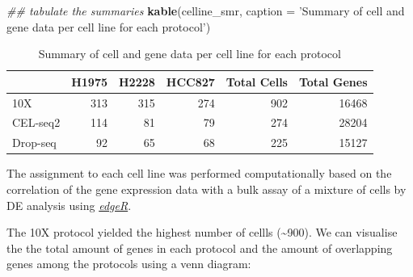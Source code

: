\documentclass[]{book}
\newenvironment{Shaded}{\begin{snugshade}}{\end{snugshade}}
\newcommand{\CommentTok}[1]{\textcolor[rgb]{0.56,0.35,0.01}{\textit{#1}}}
\newcommand{\DataTypeTok}[1]{\textcolor[rgb]{0.13,0.29,0.53}{#1}}
\newcommand{\KeywordTok}[1]{\textcolor[rgb]{0.13,0.29,0.53}{\textbf{#1}}}
\newcommand{\NormalTok}[1]{#1}
\newcommand{\StringTok}[1]{\textcolor[rgb]{0.31,0.60,0.02}{#1}}
\theoremstyle{definition}
\theoremstyle{definition}
\theoremstyle{definition}
\theoremstyle{remark}
\begin{document}
\begin{Shaded}
\begin{Highlighting}[]
\CommentTok{## tabulate the summaries}
\KeywordTok{kable}\NormalTok{(celline_smr,}
      \DataTypeTok{caption =} \StringTok{'Summary of cell and gene data }
\StringTok{      per cell line for each protocol'}\NormalTok{)}
\end{Highlighting}
\end{Shaded}

\begin{table}

\caption{\label{tab:unnamed-chunk-9}Summary of cell and gene data 
      per cell line for each protocol}
\centering
\begin{tabular}[t]{l|r|r|r|r|r}
\hline
  & H1975 & H2228 & HCC827 & Total Cells & Total Genes\\
\hline
10X & 313 & 315 & 274 & 902 & 16468\\
\hline
CEL-seq2 & 114 & 81 & 79 & 274 & 28204\\
\hline
Drop-seq & 92 & 65 & 68 & 225 & 15127\\
\hline
\end{tabular}
\end{table}

The assignment to each cell line was performed computationally based on
the correlation of the gene expression data with a bulk assay of a
mixture of cells by DE analysis using
\href{https://bioconductor.org/packages/release/bioc/html/edgeR.html}{\emph{edgeR}}.

The 10X protocol yielded the highest number of cellls
(\textasciitilde{}900). We can visualise the the total amount of genes
in each protocol and the amount of overlapping genes among the protocols
using a venn diagram:
\end{document}
